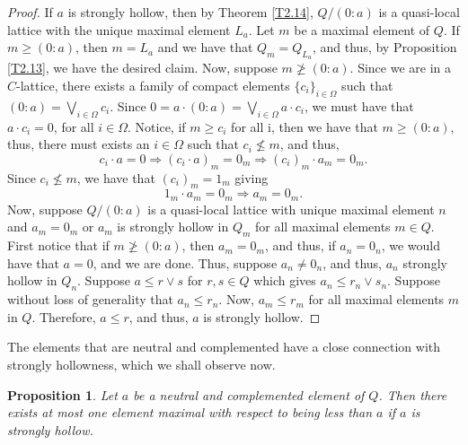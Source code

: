 \documentclass[11pt,english]{amsart}
\newtheorem{proposition}[theorem]{Proposition}
\theoremstyle{definition}
\numberwithin{equation}{section}
\theoremstyle{remark}
\def\leq{\leqslant}
\begin{document}
	\begin{proof}
		If $a$ is strongly hollow, then by Theorem \ref{T2.14}, $Q/(0:a)$ is a quasi-local lattice with the unique maximal element $L_a$. Let $m$ be a maximal element of $Q$. If $m\geqslant (0:a)$, then $m=L_a$ and we have that $Q_m=Q_{L_a}$, and thus, by Proposition \ref{T2.13}, we have the desired claim. Now, suppose $m\ngeq (0:a)$. Since we are in a $C$-lattice, there exists a family of compact elements $\{c_i\}_{i\in \Omega}$  such that \((0:a)=\bigvee_{ i \in \Omega }c_i \). Since $0=a\cdot (0:a)=\bigvee_{ i \in \Omega }a\cdot c_i$, we must have that $a\cdot c_i=0$, for all $i\in \Omega$. Notice, if $m\geq c_i$ for all i, then we have that $m\geqslant (0:a)$, thus, there must exists an $i\in \Omega$ such that $c_i\nleq m$, and thus, \[c_i\cdot a=0 \Rightarrow (c_i\cdot a)_m=0_m \Rightarrow (c_i)_m\cdot a_m=0_m.\] Since \(c_i\nleq m\), we have that \((c_i)_m=1_m\) giving \[1_m\cdot a_m=0_m\Rightarrow a_m=0_m.\]
		Now, suppose $Q/(0:a)$ is a quasi-local lattice with unique maximal element $n$ and $a_m=0_m$ or $a_m$ is strongly hollow in $Q_m$ for all maximal elements $m\in Q$. First notice that if $m\ngeq (0:a)$, then $a_m=0_m$, and thus, if $a_n=0_n$, we would have that $a=0$, and we are done. Thus, suppose $a_n\neq 0_n$, and thus, $a_n$ strongly hollow in $Q_n$. Suppose $a\leq r\vee s$ for $r,s\in Q$ which gives $a_n\leq r_n\vee s_n$. Suppose without loss of generality that $a_n\leq r_n$. Now, $a_m\leq r_m$ for all maximal elements $m$ in $Q$. Therefore, $a\leq r$, and thus, $a$ is strongly hollow.
	\end{proof}
	
	The elements that are neutral and complemented have a close connection with strongly hollowness, which we shall observe now.
	
	\begin{proposition}
		Let $a$ be a neutral and complemented element of $Q$. Then there exists at most one element maximal with respect to being less than $a$ if $a$ is strongly hollow.
	\end{proposition}
    
\end{document}
